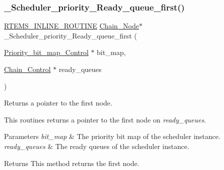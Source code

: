 \subsubsection{\texorpdfstring{\_Scheduler\_priority\_Ready\_queue\_first()}{\_Scheduler\_priority\_Ready\_queue\_first()}}
{\footnotesize\ttfamily \mbox{\hyperlink{group__RTEMSScoreBaseDefs_gac216239df231d5dbd15e3520b0b9313f}{R\+T\+E\+M\+S\+\_\+\+I\+N\+L\+I\+N\+E\+\_\+\+R\+O\+U\+T\+I\+NE}} \mbox{\hyperlink{group__RTEMSScoreChain_ga0dd4bfcca1ac7f90de2842e447846d3d}{Chain\+\_\+\+Node}}$\ast$ \+\_\+\+Scheduler\+\_\+priority\+\_\+\+Ready\+\_\+queue\+\_\+first (\begin{DoxyParamCaption}\item[{\mbox{\hyperlink{structPriority__bit__map__Control}{Priority\+\_\+bit\+\_\+map\+\_\+\+Control}} $\ast$}]{bit\+\_\+map,  }\item[{\mbox{\hyperlink{unionChain__Control}{Chain\+\_\+\+Control}} $\ast$}]{ready\+\_\+queues }\end{DoxyParamCaption})}



Returns a pointer to the first node. 

This routines returns a pointer to the first node on {\itshape ready\+\_\+queues}.


\begin{DoxyParams}{Parameters}
{\em bit\+\_\+map} & The priority bit map of the scheduler instance. \\
\hline
{\em ready\+\_\+queues} & The ready queues of the scheduler instance.\\
\hline
\end{DoxyParams}
\begin{DoxyReturn}{Returns}
This method returns the first node. 
\end{DoxyReturn}
\mbox{\label{group__RTEMSScoreSchedulerDPS_ga7a379ad8779fd574bbf2644248ba0db9}} 
